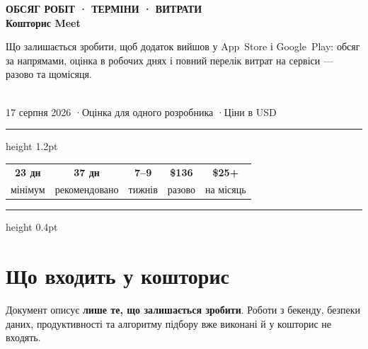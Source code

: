 \documentclass[11pt,a4paper]{article}
\begin{document}
\begin{center}
  {\color{muted}\footnotesize\bfseries ОБСЯГ РОБІТ · ТЕРМІНИ · ВИТРАТИ}\\[10pt]
  {\color{ink}\fontsize{30}{34}\selectfont\bfseries Кошторис Meet}\\[12pt]
  \begin{minipage}{0.86\textwidth}
    \centering
    Що залишається зробити, щоб додаток вийшов у App~Store і Google~Play:
    обсяг за напрямами, оцінка в робочих днях і повний перелік витрат на
    сервіси --- разово та щомісяця.
  \end{minipage}\\[14pt]
  {\color{muted}\footnotesize 17 серпня 2026 \quad·\quad Оцінка для одного розробника \quad·\quad Ціни в USD}
\end{center}

\vspace{6pt}
{\color{ink}\hrule height 1.2pt}
\vspace{12pt}

\begin{center}
\setlength{\tabcolsep}{10pt}
\begin{tabular}{ccccc}
  {\color{ink}\Large\bfseries 23 дн} &
  {\color{accent}\Large\bfseries 37 дн} &
  {\color{ink}\Large\bfseries 7--9} &
  {\color{ink}\Large\bfseries \$136} &
  {\color{ink}\Large\bfseries \$25+} \\[2pt]
  {\color{muted}\scriptsize мінімум} &
  {\color{muted}\scriptsize рекомендовано} &
  {\color{muted}\scriptsize тижнів} &
  {\color{muted}\scriptsize разово} &
  {\color{muted}\scriptsize на місяць} \\
\end{tabular}
\end{center}

\vspace{10pt}
{\color{line}\hrule height 0.4pt}

\section{Що входить у кошторис}

Документ описує \textbf{лише те, що залишається зробити}. Роботи з бекенду,
безпеки даних, продуктивності та алгоритму підбору вже виконані й у кошторис
не входять.
\end{document}

